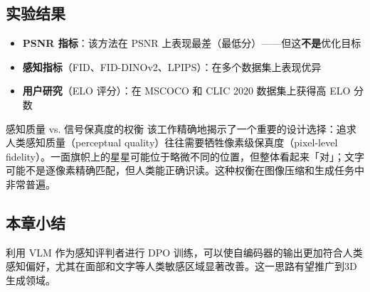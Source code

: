 \subsection{实验结果}

\begin{itemize}
    \item \textbf{PSNR 指标}：该方法在 PSNR 上表现最差（最低分）——但这\textbf{不是}优化目标
    \item \textbf{感知指标}（FID、FID-DINOv2、LPIPS）：在多个数据集上表现优异
    \item \textbf{用户研究}（ELO 评分）：在 MSCOCO 和 CLIC 2020 数据集上获得高 ELO 分数
\end{itemize}

\begin{knowledgebox}{感知质量 vs. 信号保真度的权衡}
该工作精确地揭示了一个重要的设计选择：追求人类感知质量（perceptual quality）往往需要牺牲像素级保真度（pixel-level fidelity）。一面旗帜上的星星可能位于略微不同的位置，但整体看起来「对」；文字可能不是逐像素精确匹配，但人类能正确识读。这种权衡在图像压缩和生成任务中非常普遍。
\end{knowledgebox}

\subsection{本章小结}

利用 VLM 作为感知评判者进行 DPO 训练，可以使自编码器的输出更加符合人类感知偏好，尤其在面部和文字等人类敏感区域显著改善。这一思路有望推广到3D生成领域。


